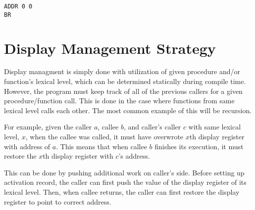 \documentclass{article}
\begin{document}
\begin{lstlisting}
ADDR 0 0
BR
\end{lstlisting}

\section{Display Management Strategy} \label{display}

Display managment is simply done with utilization of given procedure and/or function's lexical level, which can be determined statically during compile time. However, the program must keep track of all of the previous callers for a given procedure/function call. This is done in the case where functions from same lexical level calls each other. The most common example of this will be recursion.

For example, given the caller $a$, callee $b$, and caller's caller $c$ with same lexical level, $x$, when the callee was called, it must have overwrote $x$th display register with address of $a$. This means that when callee $b$ finishes its execution, it must restore the $x$th display register with $c$'s address.

This can be done by pushing additional work on caller's side. Before setting up activation record, the caller can first push the value of the display register of its lexical level. Then, when callee returns, the caller can first restore the display register to point to correct address.
\end{document}

